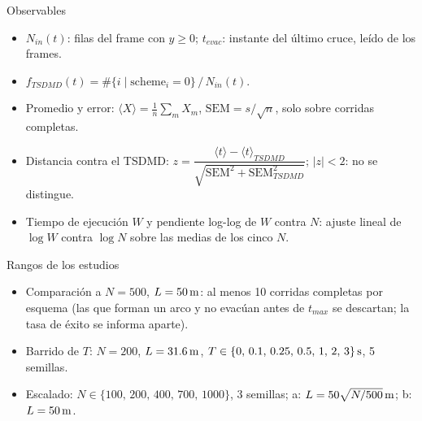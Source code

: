 \begin{frame}{Observables}
  \small
  \begin{itemize}
    \item $N_{in}(t)$: filas del frame con $y \ge 0$; $t_{evac}$: instante del último cruce, leído
      de los frames.
    \item $f_{TSDMD}(t) = \#\{i \mid \mathrm{scheme}_i=0\}\,/\,N_{in}(t)$.
    \item Promedio y error: $\langle X\rangle=\frac1n\sum_m X_m$, \quad
      $\mathrm{SEM}=s/\sqrt n$, solo sobre corridas completas.
    \item Distancia contra el TSDMD:
      $z=\dfrac{\langle t\rangle-\langle t\rangle_{TSDMD}}{\sqrt{\mathrm{SEM}^2+\mathrm{SEM}_{TSDMD}^2}}$;
      $|z|<2$: no se distingue.
    \item Tiempo de ejecución $W$ y pendiente log-log de $W$ contra $N$: ajuste lineal de $\log W$ contra $\log N$ sobre las medias de los cinco $N$.
  \end{itemize}
\end{frame}

\begin{frame}{Rangos de los estudios}
  \small
  \begin{itemize}
    \item Comparación a $N = 500$, $L = 50\,\mathrm{m}$: al menos 10 corridas completas por esquema
      (las que forman un arco y no evacúan antes de $t_{max}$ se descartan; la tasa de éxito
      se informa aparte).
    \item Barrido de $T$: $N = 200$, $L = 31.6\,\mathrm{m}$,
      $T\in\{0,\,0.1,\,0.25,\,0.5,\,1,\,2,\,3\}\,\mathrm{s}$, 5 semillas.
    \item Escalado: $N\in\{100,\,200,\,400,\,700,\,1000\}$, 3 semillas;
      a: $L = 50\sqrt{N/500}\,\mathrm{m}$; b: $L = 50\,\mathrm{m}$.
  \end{itemize}
\end{frame}
